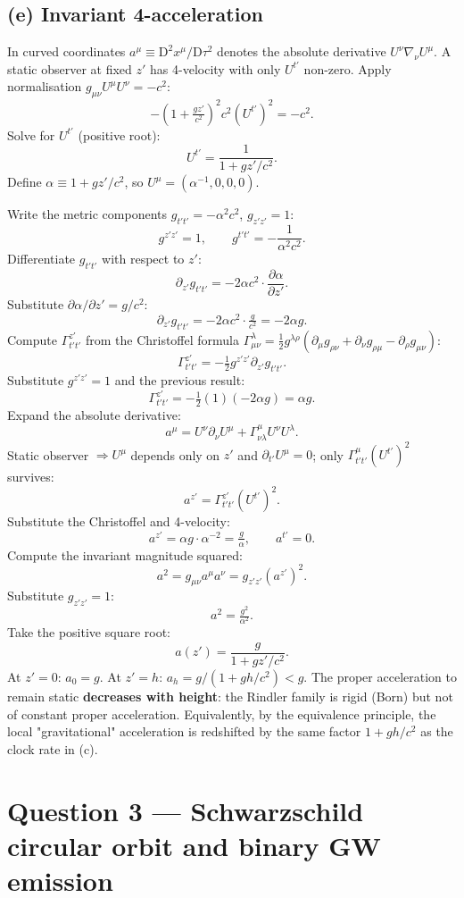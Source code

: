 \documentclass[11pt]{article}
\newcommand{\D}{\mathrm{D}}
\newcommand{\pd}[2]{\frac{\partial #1}{\partial #2}}
\begin{document}
\subsection*{(e) Invariant 4-acceleration}

In curved coordinates $a^\mu \equiv \D^2 x^\mu/\D\tau^2$ denotes the absolute derivative $U^\nu\nabla_\nu U^\mu$. A static observer at fixed $z'$ has 4-velocity with only $U^{t'}$ non-zero. Apply normalisation $g_{\mu\nu}U^\mu U^\nu = -c^2$:
\[ -\left(1+\tfrac{gz'}{c^2}\right)^{\!2}\!c^2 (U^{t'})^2 = -c^2. \]
Solve for $U^{t'}$ (positive root):
\[ U^{t'} = \frac{1}{1+gz'/c^2}. \]
Define $\alpha\equiv 1+gz'/c^2$, so $U^\mu = (\alpha^{-1},0,0,0)$.

Write the metric components $g_{t't'} = -\alpha^2 c^2$, $g_{z'z'}=1$:
\[ g^{z'z'}=1,\qquad g^{t't'} = -\frac{1}{\alpha^2 c^2}. \]
Differentiate $g_{t't'}$ with respect to $z'$:
\[ \partial_{z'}g_{t't'} = -2\alpha c^2\cdot \pd{\alpha}{z'}. \]
Substitute $\partial\alpha/\partial z' = g/c^2$:
\[ \partial_{z'}g_{t't'} = -2\alpha c^2\cdot \tfrac{g}{c^2} = -2\alpha g. \]
Compute $\Gamma^{z'}_{t't'}$ from the Christoffel formula $\Gamma^\lambda_{\mu\nu} = \tfrac12 g^{\lambda\rho}(\partial_\mu g_{\rho\nu}+\partial_\nu g_{\rho\mu}-\partial_\rho g_{\mu\nu})$:
\[ \Gamma^{z'}_{t't'} = -\tfrac12 g^{z'z'}\partial_{z'}g_{t't'}. \]
Substitute $g^{z'z'}=1$ and the previous result:
\[ \Gamma^{z'}_{t't'} = -\tfrac12 (1)(-2\alpha g) = \alpha g. \]
Expand the absolute derivative:
\[ a^\mu = U^\nu\partial_\nu U^\mu + \Gamma^\mu_{\nu\lambda}U^\nu U^\lambda. \]
Static observer $\Rightarrow U^\mu$ depends only on $z'$ and $\partial_{t'}U^\mu=0$; only $\Gamma^\mu_{t't'}(U^{t'})^2$ survives:
\[ a^{z'} = \Gamma^{z'}_{t't'}(U^{t'})^2. \]
Substitute the Christoffel and 4-velocity:
\[ a^{z'} = \alpha g\cdot \alpha^{-2} = \tfrac{g}{\alpha},\qquad a^{t'}=0. \]
Compute the invariant magnitude squared:
\[ a^2 = g_{\mu\nu}a^\mu a^\nu = g_{z'z'}(a^{z'})^2. \]
Substitute $g_{z'z'}=1$:
\[ a^2 = \tfrac{g^2}{\alpha^2}. \]
Take the positive square root:
\[ \boxed{\;a(z') = \frac{g}{1 + gz'/c^2}.\;} \]
At $z'=0$: $a_0 = g$. At $z'=h$: $a_h = g/(1+gh/c^2) < g$. The proper acceleration to remain static \textbf{decreases with height}: the Rindler family is rigid (Born) but not of constant proper acceleration. Equivalently, by the equivalence principle, the local "gravitational" acceleration is redshifted by the same factor $1+gh/c^2$ as the clock rate in (c).

\section*{Question 3 --- Schwarzschild circular orbit and binary GW emission}
\end{document}
